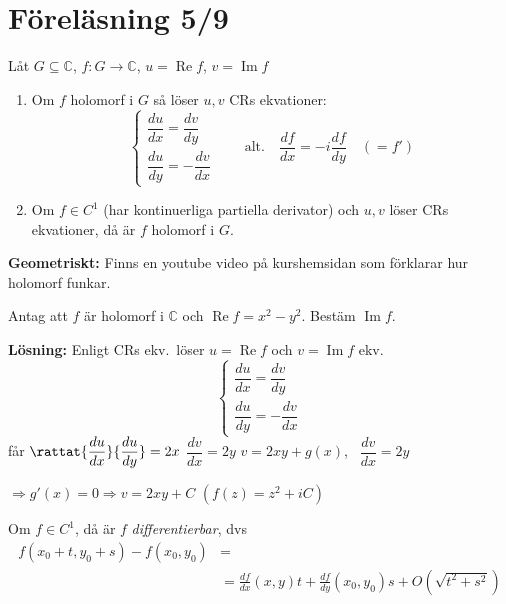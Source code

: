 \section{Föreläsning 5/9}

\begin{theorem}
Låt $G \subseteq \mathbb{C}$, $f : G \to \mathbb{C}$, $u = \operatorname{Re} f$, $v = \operatorname{Im} f$
\begin{enumerate}[label=\alph*)]
  \item Om $f$  holomorf i $G$ så löser $u, v$ CRs ekvationer:
  \[ \begin{cases} \dfrac{du}{dx} = \dfrac{dv}{dy} \\[2ex] \dfrac{du}{dy} = -\dfrac{dv}{dx} \end{cases} \qquad \text{alt.} \quad \frac{df}{dx} = -i \frac{df}{dy} \quad (= f') \]
  \item Om $f \in C^1$ (har kontinuerliga partiella derivator) och $u, v$ löser CRs ekvationer, då är $f$ holomorf i $G$.
\end{enumerate}
\end{theorem}

\textbf{Geometriskt:}
\textcolor{magenta!80!black}{Finns en youtube video på kurshemsidan som förklarar hur holomorf funkar.}

\begin{example}
Antag att $f$ är holomorf i $\mathbb{C}$ och $\operatorname{Re} f = x^2 - y^2$. Bestäm $\operatorname{Im} f$.

\textbf{Lösning:} Enligt CRs ekv.\ löser $u = \operatorname{Re} f$ och $v = \operatorname{Im} f$ ekv.
\[ \begin{cases} \dfrac{du}{dx} = \dfrac{dv}{dy} \\[2ex] \dfrac{du}{dy} = -\dfrac{dv}{dx} \end{cases} \]
får $\rattat{\dfrac{du}{dx}}{\dfrac{du}{dy}} = 2x$ \quad $\dfrac{dv}{dx} = 2y$ \quad $v = 2xy + g(x)$, \ $\dfrac{dv}{dx} = 2y$

$\Rightarrow g'(x) = 0 \Rightarrow v = 2xy + C$ \qquad $(f(z) = z^2 + iC)$
\end{example}

\begin{theorem}[(2.3 PB, 12.64 Ad)]
Om $f \in C^1$, då är $f$ \emph{differentierbar}, dvs
\begin{align*}
  f(x_0 + t, y_0 + s) - f(x_0, y_0) &= \\
  &= \frac{df}{dx}(x, y)t + \frac{df}{dy}(x_0, y_0)s + O\left(\sqrt{t^2 + s^2}\right)
\end{align*}
\end{theorem}

